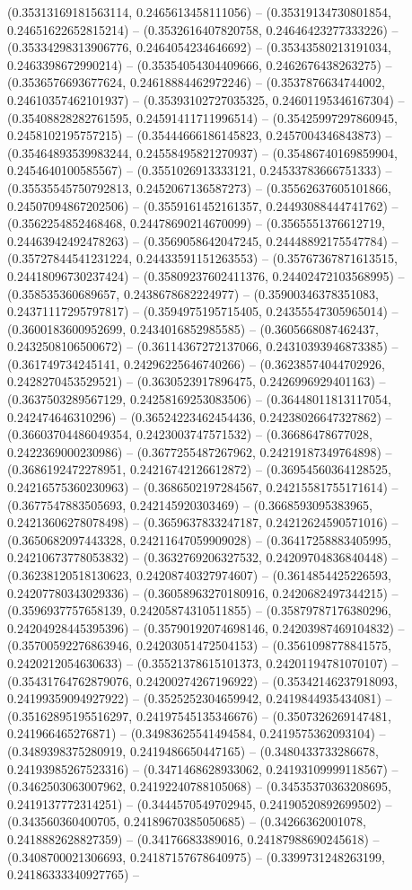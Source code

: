 (0.35313169181563114, 0.2465613458111056) -- (0.35319134730801854, 0.24651622652815214) -- (0.3532616407820758, 0.24646423277333226) -- (0.35334298313906776, 0.2464054234646692) -- (0.35343580213191034, 0.2463398672990214) -- (0.35354054304409666, 0.2462676438263275) -- (0.3536576693677624, 0.24618884462972246) -- (0.3537876634744002, 0.24610357462101937) -- (0.35393102727035325, 0.24601195346167304) -- (0.35408828282761595, 0.24591411711996514) -- (0.35425997297860945, 0.2458102195757215) -- (0.35444666186145823, 0.2457004346843873) -- (0.35464893539983244, 0.24558495821270937) -- (0.35486740169859904, 0.2454640100585567) -- (0.3551026913333121, 0.24533783666751333) -- (0.35535545750792813, 0.2452067136587273) -- (0.35562637605101866, 0.24507094867202506) -- (0.3559161452161357, 0.24493088444741762) -- (0.3562254852468468, 0.24478690214670099) -- (0.3565551376612719, 0.24463942492478263) -- (0.3569058642047245, 0.24448892175547784) -- (0.35727844541231224, 0.24433591151263553) -- (0.35767367871613515, 0.24418096730237424) -- (0.35809237602411376, 0.24402472103568995) -- (0.358535360689657, 0.2438678682224977) -- (0.35900346378351083, 0.24371117295797817) -- (0.3594975195715405, 0.24355547305965014) -- (0.3600183600952699, 0.2434016852985585) -- (0.3605668087462437, 0.2432508106500672) -- (0.36114367272137066, 0.24310393946873385) -- (0.361749734245141, 0.24296225646740266) -- (0.36238574044702926, 0.2428270453529521) -- (0.3630523917896475, 0.2426996929401163) -- (0.3637503289567129, 0.24258169253083506) -- (0.36448011813117054, 0.242474646310296) -- (0.36524223462454436, 0.24238026647327862) -- (0.36603704486049354, 0.2423003747571532) -- (0.36686478677028, 0.2422369000230986) -- (0.3677255487267962, 0.24219187349764898) -- (0.3686192472278951, 0.24216742126612872) -- (0.36954560364128525, 0.24216575360230963) -- (0.3686502197284567, 0.24215581755171614) -- (0.3677547883505693, 0.242145920303469) -- (0.3668593095383965, 0.24213606278078498) -- (0.3659637833247187, 0.24212624590571016) -- (0.3650682097443328, 0.24211647059909028) -- (0.36417258883405995, 0.24210673778053832) -- (0.3632769206327532, 0.24209704836840448) -- (0.36238120518130623, 0.24208740327974607) -- (0.3614854425226593, 0.24207780343029336) -- (0.36058963270180916, 0.2420682497344215) -- (0.3596937757658139, 0.24205874310511855) -- (0.35879787176380296, 0.24204928445395396) -- (0.35790192074698146, 0.24203987469104832) -- (0.35700592276863946, 0.24203051472504153) -- (0.3561098778841575, 0.2420212054630633) -- (0.35521378615101373, 0.24201194781070107) -- (0.35431764762879076, 0.24200274267196922) -- (0.35342146237918093, 0.24199359094927922) -- (0.3525252304659942, 0.2419844935434081) -- (0.35162895195516297, 0.24197545135346676) -- (0.3507326269147481, 0.241966465276871) -- (0.34983625541494584, 0.2419575362093104) -- (0.3489398375280919, 0.2419486650447165) -- (0.3480433733286678, 0.24193985267523316) -- (0.3471468628933062, 0.24193109999118567) -- (0.3462503063007962, 0.24192240788105068) -- (0.34535370363208695, 0.2419137772314251) -- (0.3444570549702945, 0.24190520892699502) -- (0.343560360400705, 0.24189670385050685) -- (0.34266362001078, 0.2418882628827359) -- (0.34176683389016, 0.24187988690245618) -- (0.3408700021306693, 0.24187157678640975) -- (0.3399731248263199, 0.24186333340927765) -- 